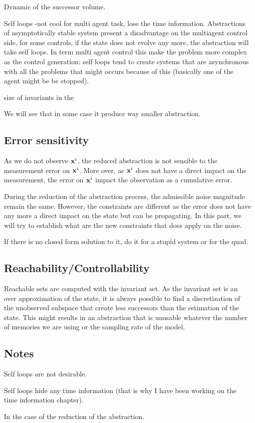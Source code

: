 Dynamic of the successor volume.

Self loops -not cool for multi agent task, lose the time information.
Abstractions of asymptotically stable system present a disadvantage on the multiagent control side, for some controls, if the state does not evolve any more, the abstraction will take self loops.
In term multi agent control this make the problem more complex as the control generation: self loops tend to create systems that are asynchronous with all the problems that might occurs because of this (basically one of the agent might be be stopped).

size of invariants in the 


We will see that in some case it produce way smaller abstraction.

\subsection{Error sensitivity}
As we do not observe $ \mathbf{x}^i$, the reduced abstraction is not sensible to the measurement error on $ \mathbf{x}^i$. More over, as $ \mathbf{x}^i$ does not have a direct impact on the measurement, the error on $ \mathbf{x}^i$ impact the observation as a cumulative error.

During the reduction of the abstraction process, the admissible noise magnitude remain the same. However, the constraints are different as the error does not have any more a direct impact on the state but can be propagating.
In this part, we will try to establish what are the new constraints that does apply on the noise.

If there is no closed form solution to it, do it for a stupid system or for the quad.

\subsection{Reachability/Controllability}
Reachable sets are computed with the invariant set. As the invariant set is an over approximation of the state, it is always possible to find a discretization of the unobserved subspace that create less successors than the estimation of the state.
This might results in an abstraction that is unusable whatever the number of memories we are using or the sampling rate of the model.

\subsection{Notes}
Self loops are not desirable.

Self loops hide any time information (that is why I have been working on the time information chapter).

In the case of the reduction of the abstraction.